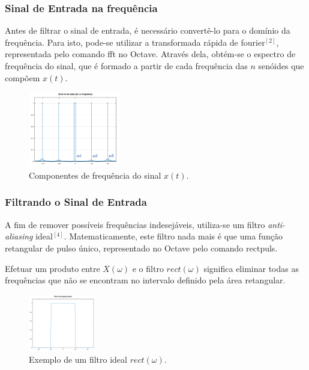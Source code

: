 \documentclass[journal]{IEEEtran}
\begin{document}
\subsubsection{Sinal de Entrada na frequência}

Antes de filtrar o sinal de entrada, é necessário convertê-lo para o domínio da frequência. Para isto, pode-se utilizar a transformada rápida de fourier$^{[2]}$, representada pelo comando {\selectfont fft} no Octave. Através dela, obtém-se o espectro de frequência do sinal, que é formado a partir de cada frequência das $n$ senóides que compõem $x(t)$.

\begin{figure}[H]
\captionsetup{justification=centering}
\centering %
\includegraphics[width=4cm]{ex_sinal_entrada_freq.png} %
\caption{Componentes de frequência do sinal $x(t)$.}
\end{figure}

\subsubsection{Filtrando o Sinal de Entrada}

A fim de remover possíveis frequências indesejáveis, utiliza-se um filtro \textit{anti-aliasing} ideal$^{[4]}$. Matematicamente, este filtro nada mais é que uma função retangular de pulso único, representado no Octave pelo comando {\selectfont rectpuls}. 

Efetuar um produto entre $X(\omega)$ e o filtro $rect(\omega)$ significa eliminar todas as frequências que não se encontram no intervalo definido pela área retangular. 

\begin{figure}[H]
\captionsetup{justification=centering}
\centering %
\includegraphics[width=3cm]{ex_filtro_aliasing.png} %
\caption{Exemplo de um filtro ideal $rect(\omega)$.}
\end{figure}
\end{document}
